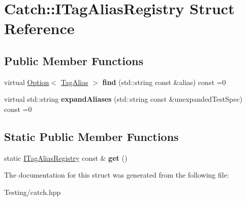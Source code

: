 \hypertarget{struct_catch_1_1_i_tag_alias_registry}{\section{Catch\-:\-:I\-Tag\-Alias\-Registry Struct Reference}
\label{struct_catch_1_1_i_tag_alias_registry}
}
\subsection*{Public Member Functions}
\begin{DoxyCompactItemize}
\item 
\hypertarget{struct_catch_1_1_i_tag_alias_registry_a7d2fba4d39cfcc62c2695fcde4f989c3}{virtual \hyperlink{class_catch_1_1_option}{Option}$<$ \hyperlink{struct_catch_1_1_tag_alias}{Tag\-Alias} $>$ {\bfseries find} (std\-::string const \&alias) const =0}\label{struct_catch_1_1_i_tag_alias_registry_a7d2fba4d39cfcc62c2695fcde4f989c3}

\item 
\hypertarget{struct_catch_1_1_i_tag_alias_registry_ae729a7532faf7466db1a157ce0395170}{virtual std\-::string {\bfseries expand\-Aliases} (std\-::string const \&unexpanded\-Test\-Spec) const =0}\label{struct_catch_1_1_i_tag_alias_registry_ae729a7532faf7466db1a157ce0395170}

\end{DoxyCompactItemize}
\subsection*{Static Public Member Functions}
\begin{DoxyCompactItemize}
\item 
\hypertarget{struct_catch_1_1_i_tag_alias_registry_aa9d0f008f49473389c7abf6071f137a7}{static \hyperlink{struct_catch_1_1_i_tag_alias_registry}{I\-Tag\-Alias\-Registry} const \& {\bfseries get} ()}\label{struct_catch_1_1_i_tag_alias_registry_aa9d0f008f49473389c7abf6071f137a7}

\end{DoxyCompactItemize}


The documentation for this struct was generated from the following file\-:\begin{DoxyCompactItemize}
\item 
Testing/catch.\-hpp\end{DoxyCompactItemize}
